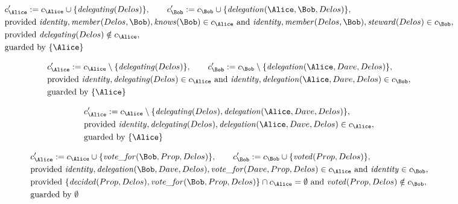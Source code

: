 \begin{align*}
&
c'_
{
\Alice
}
 := 
c_
{
\Alice
}
 \cup 
\{
\mathit{\detokenize{
delegating
}}
(
Delos
)
\}
, \qquad 
c'_
{
\Bob
}
 := 
c_
{
\Bob
}
 \cup 
\{
\mathit{\detokenize{
delegation
}}
(
\Alice
,
\Bob
,
Delos
)
\}
,\\
&
\text{provided } 
\mathit{\detokenize{
identity
}}
,
\mathit{\detokenize{
member
}}
(
Delos
,
\Bob
)
,
\mathit{\detokenize{
knows
}}
(
\Bob
)
 \in c_
{
\Alice
}
 \text{ and } 
\mathit{\detokenize{
identity
}}
,
\mathit{\detokenize{
member
}}
(
Delos
,
\Bob
)
,
\mathit{\detokenize{
steward
}}
(
Delos
)
 \in c_
{
\Bob
}
,\\
&
\text{provided } 
\mathit{\detokenize{
delegating
}}
(
Delos
)
 \notin c_
{
\Alice
}
,\\
&
\text{guarded by } \{
\Alice
\}
\end{align*}

\begin{align*}
&
c'_
{
\Alice
}
 := 
c_
{
\Alice
}
 \setminus 
\{
\mathit{\detokenize{
delegating
}}
(
Delos
)
\}
, \qquad 
c'_
{
\Bob
}
 := 
c_
{
\Bob
}
 \setminus 
\{
\mathit{\detokenize{
delegation
}}
(
\Alice
,
Dave
,
Delos
)
\}
,\\
&
\text{provided } 
\mathit{\detokenize{
identity
}}
,
\mathit{\detokenize{
delegating
}}
(
Delos
)
 \in c_
{
\Alice
}
 \text{ and } 
\mathit{\detokenize{
identity
}}
,
\mathit{\detokenize{
delegation
}}
(
\Alice
,
Dave
,
Delos
)
 \in c_
{
\Bob
}
,\\
&
\text{guarded by } \{
\Alice
\}
\end{align*}

\begin{align*}
&
c'_
{
\Alice
}
 := 
c_
{
\Alice
}
 \setminus 
\{
\mathit{\detokenize{
delegating
}}
(
Delos
)
,
\mathit{\detokenize{
delegation
}}
(
\Alice
,
Dave
,
Delos
)
\}
,\\
&
\text{provided } 
\mathit{\detokenize{
identity
}}
,
\mathit{\detokenize{
delegating
}}
(
Delos
)
,
\mathit{\detokenize{
delegation
}}
(
\Alice
,
Dave
,
Delos
)
 \in c_
{
\Alice
}
,\\
&
\text{guarded by } \{
\Alice
\}
\end{align*}

\begin{align*}
&
c'_
{
\Alice
}
 := 
c_
{
\Alice
}
 \cup 
\{
\mathit{\detokenize{
vote_for
}}
(
\Bob
,
Prop
,
Delos
)
\}
, \qquad 
c'_
{
\Bob
}
 := 
c_
{
\Bob
}
 \cup 
\{
\mathit{\detokenize{
voted
}}
(
Prop
,
Delos
)
\}
,\\
&
\text{provided } 
\mathit{\detokenize{
identity
}}
,
\mathit{\detokenize{
delegation
}}
(
\Bob
,
Dave
,
Delos
)
,
\mathit{\detokenize{
vote_for
}}
(
Dave
,
Prop
,
Delos
)
 \in c_
{
\Alice
}
 \text{ and } 
\mathit{\detokenize{
identity
}}
 \in c_
{
\Bob
}
,\\
&
\text{provided } 
\{
\mathit{\detokenize{
decided
}}
(
Prop
,
Delos
)
,
\mathit{\detokenize{
vote_for
}}
(
\Bob
,
Prop
,
Delos
)
\}
 \cap c_
{
\Alice
}
 = \emptyset
 \text{ and } 
\mathit{\detokenize{
voted
}}
(
Prop
,
Delos
)
 \notin c_
{
\Bob
}
,\\
&
\text{guarded by } \emptyset
\end{align*}
